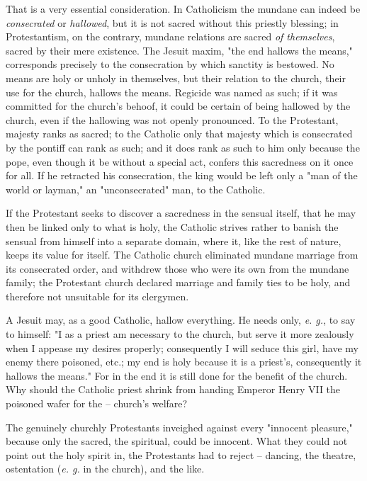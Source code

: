 That is a very essential consideration. In Catholicism the mundane can indeed 
be \textit{consecrated} or \textit{hallowed}, but it is not sacred without 
this priestly blessing; in Protestantism, on the contrary, mundane relations 
are sacred \textit{of themselves}, sacred by their mere existence. The Jesuit 
maxim, "{}the end hallows the means,"{} corresponds precisely to the 
consecration by which sanctity is bestowed. No means are holy or unholy in 
themselves, but their relation to the church, their use for the church, 
hallows the means. Regicide was named as such; if it was committed for the 
church's behoof, it could be certain of being hallowed by the church, even if 
the hallowing was not openly pronounced. To the Protestant, majesty ranks as 
sacred; to the Catholic only that majesty which is consecrated by the pontiff 
can rank as such; and it does rank as such to him only because the pope, even 
though it be without a special act, confers this sacredness on it once for 
all. If he retracted his consecration, the king would be left only a "{}man of 
the world or layman,"{} an "{}unconsecrated"{} man, to the Catholic.

If the Protestant seeks to discover a sacredness in the sensual itself, that 
he may then be linked only to what is holy, the Catholic strives rather to 
banish the sensual from himself into a separate domain, where it, like the 
rest of nature, keeps its value for itself. The Catholic church eliminated 
mundane marriage from its consecrated order, and withdrew those who were its 
own from the mundane family; the Protestant church declared marriage and 
family ties to be holy, and therefore not unsuitable for its clergymen.

A Jesuit may, as a good Catholic, hallow everything. He needs only, \textit{e. 
g.}, to say to himself: "{}I as a priest am necessary to the church, but serve 
it more zealously when I appease my desires properly; consequently I will 
seduce this girl, have my enemy there poisoned, etc.; my end is holy because 
it is a priest's, consequently it hallows the means."{} For in the end it is 
still done for the benefit of the church. Why should the Catholic priest 
shrink from handing Emperor Henry VII the poisoned wafer for the -- church's 
welfare?

The genuinely churchly Protestants inveighed against every "{}innocent 
pleasure,"{} because only the sacred, the spiritual, could be innocent. What 
they could not point out the holy spirit in, the Protestants had to reject -- 
dancing, the theatre, ostentation (\textit{e. g.} in the church), and the 
like.

